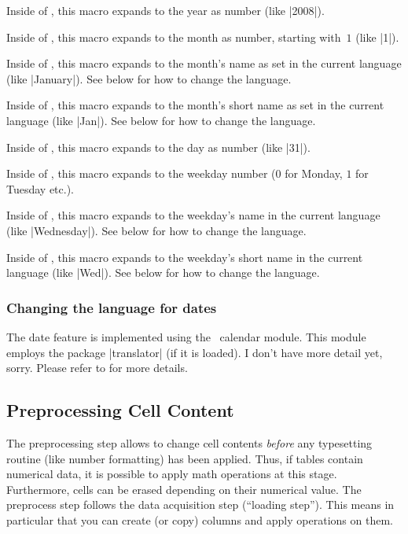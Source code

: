 \begin{command}{\year}
	Inside of , this macro expands to the year as number (like |2008|).
\end{command}
\begin{command}{\month}
	Inside of , this macro expands to the month as number, starting with~$1$ (like |1|).
\end{command}
\begin{command}{\monthname}
	Inside of , this macro expands to the month's name as set in the current language (like |January|).
	 See below for how to change the language.
\end{command}
\begin{command}{\monthshortname}
	Inside of , this macro expands to the month's short name as set in the current language (like |Jan|). 
	See below for how to change the language.
\end{command}
\begin{command}{\day}
	Inside of , this macro expands to the day as number (like |31|).
\end{command}
\begin{command}{\weekday}
	Inside of , this macro expands to the weekday number ($0$ for Monday, $1$ for Tuesday etc.).
\end{command}
\begin{command}{\weekdayname}
	Inside of , this macro expands to the weekday's name in the current language (like |Wednesday|).
	 See below for how to change the language.
\end{command}
\begin{command}{\weekdayshortname}
	Inside of , this macro expands to the weekday's short name in the current language (like |Wed|).
	 See below for how to change the language.
\end{command}
\subsubsection*{Changing the language for dates}
The date feature is implemented using the \PGF\ calendar module. This module employs the package |translator| (if it is loaded). I don't have more detail yet, sorry. Please refer to \cite{tikz} for more details.

\subsection{Preprocessing Cell Content}
\label{sec:pgfplotstable:preproc}
The preprocessing step allows to change cell contents \emph{before} any typesetting routine (like number formatting) has been applied. Thus, if tables contain numerical data, it is possible to apply math operations at this stage. Furthermore, cells can be erased depending on their numerical value. The preprocess step follows the data acquisition step (``loading step''). This means in particular that you can create (or copy) columns and apply operations on them.


